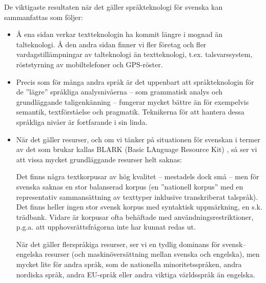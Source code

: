 \begin{multicols}{2}
De viktigaste resultaten när det gäller språkteknologi för svenska kan
sammanfattas som följer: \\ 

\begin{itemize}[itemsep=0pt,parsep=0pt]
\item Å ena sidan verkar textteknologin ha kommit längre i mognad än
  talteknologi. Å den andra sidan finner vi fler företag och fler
  vardagstillämpningar av talteknologi än textteknologi,
  t.ex. talsvarssystem, röststyrning av mobiltelefoner och GPS-röster.
\item Precis som för många andra språk är det uppen\-bart att
  språkteknologin för de ''lägre'' språkliga analysnivåerna -- som
  grammatisk analys och grundläggande taligenkänning -- fungerar
  mycket bättre än för exempelvis semantik, textförståelse och
  pragmatik. Teknikerna för att hantera dessa språkliga nivåer är
  fortfarande i sin linda.
\item När det gäller resurser, och om vi tänker på situationen för
  svenskan i termer av det som brukar kallas BLARK (Basic LAnguage
  Resource Kit) \cite{blark}, så ser vi att vissa mycket grundläggande
  resurser helt saknas:

Det finns några textkorpusar av hög kvalitet -- mestadels dock små --
men för svenska saknas en stor balanserad korpus (en ''nationell
korpus'' med en representativ sammansättning av texttyper inklusive
transkriberat talspråk). Det finns heller ingen stor svensk korpus med
syntaktisk uppmärkning, en s.k. trädbank. Vidare är korpusar ofta
behäftade med användningsrestriktioner, p.g.a. att
upphovsrättsfrågorna inte har kunnat redas ut.

När det gäller flerspråkiga resurser, ser vi en tydlig dominans för
svensk--engelska resurser (och maskinöversättning mellan svenska och
engelska), men mycket lite för andra språk, som de nationella
minoritetsspråken, andra nordiska språk, andra EU-språk eller andra
viktiga världsspråk än engelska.


\end{itemize}
\end{multicols}
